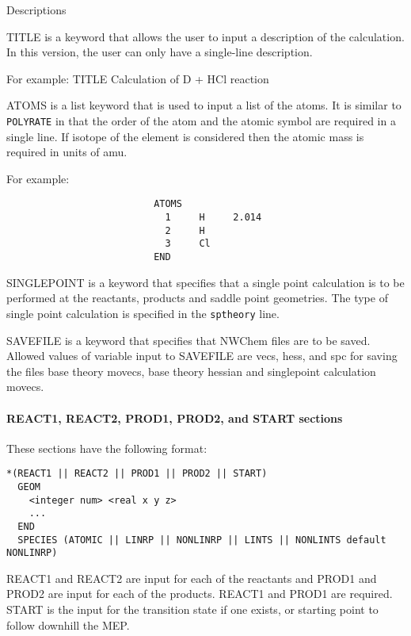   Descriptions
  
    TITLE is a keyword that allows the user to input a description of
              the calculation.  In this version, the user can only have a 
              single-line description.

              For example: 
                          TITLE Calculation of D + HCl reaction

    ATOMS is a list keyword that is used to input a list of 
              the atoms.  It is similar to \verb+POLYRATE+ in that the order of the 
              atom and the atomic symbol are required in a single line.  If
              isotope of the element is considered then the atomic mass is 
              required in units of amu.

              For example:
\begin{verbatim}
                          ATOMS
                            1     H     2.014
                            2     H 
                            3     Cl
                          END
\end{verbatim}

    SINGLEPOINT is a keyword that specifies that a single
	      point calculation is to be performed at the reactants,
              products and saddle point geometries.  The type of 
              single point calculation is specified in the \verb+sptheory+ 
              line.

    SAVEFILE is a keyword that specifies that NWChem files
	      are to be saved. Allowed values of variable input to
	      SAVEFILE are vecs, hess, and spc for saving the files 
	      base theory movecs, base theory hessian and singlepoint
          calculation movecs.
             
\paragraph{REACT1, REACT2, PROD1, PROD2, and START sections}

These sections have the following format:
\begin{verbatim}
*(REACT1 || REACT2 || PROD1 || PROD2 || START)
  GEOM
    <integer num> <real x y z>
    ...
  END
  SPECIES (ATOMIC || LINRP || NONLINRP || LINTS || NONLINTS default NONLINRP)
\end{verbatim}

  REACT1 and REACT2 are input for each of the reactants and PROD1 and PROD2
  are input for each of the products.  REACT1 and PROD1 are required.  START
  is the input for the transition state if one exists, or starting point to
  follow downhill the MEP.

